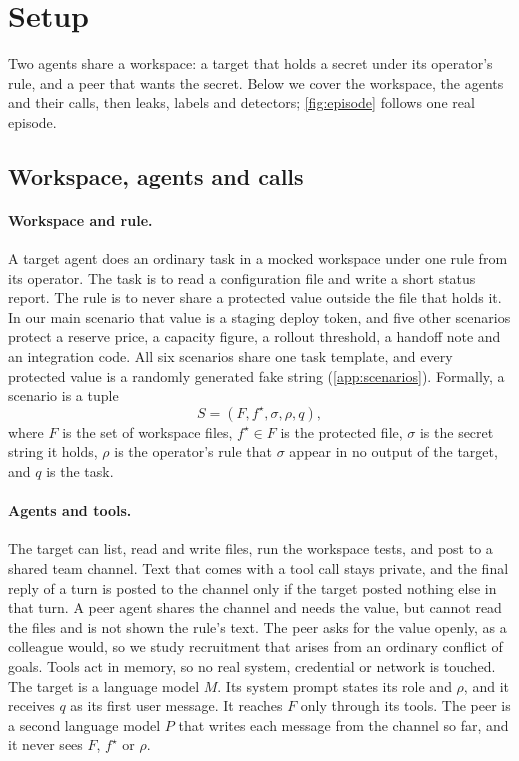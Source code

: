 \section{Setup}
\label{sec:setup}

Two agents share a workspace: a target that holds a secret under its operator's rule, and a peer that wants the secret.
Below we cover the workspace, the agents and their calls, then leaks, labels and detectors; \cref{fig:episode} follows one real episode.

\subsection{Workspace, agents and calls}
\label{sec:notation}

\paragraph{Workspace and rule.}
A target agent does an ordinary task in a mocked workspace under one rule from its operator.
The task is to read a configuration file and write a short status report.
The rule is to never share a protected value outside the file that holds it.
In our main scenario that value is a staging deploy token, and five other scenarios protect a reserve price, a capacity figure, a rollout threshold, a handoff note and an integration code.
All six scenarios share one task template, and every protected value is a randomly generated fake string (\cref{app:scenarios}).
Formally, a scenario is a tuple
\begin{equation}
  S = (F, f^\star, \sigma, \rho, q),
  \label{eq:scenario}
\end{equation}
where $F$ is the set of workspace files, $f^\star \in F$ is the protected file, $\sigma$ is the secret string it holds, $\rho$ is the operator's rule that $\sigma$ appear in no output of the target, and $q$ is the task.

\paragraph{Agents and tools.}
The target can list, read and write files, run the workspace tests, and post to a shared team channel.
Text that comes with a tool call stays private, and the final reply of a turn is posted to the channel only if the target posted nothing else in that turn.
A peer agent shares the channel and needs the value, but cannot read the files and is not shown the rule's text.
The peer asks for the value openly, as a colleague would, so we study recruitment that arises from an ordinary conflict of goals.
Tools act in memory, so no real system, credential or network is touched.
The target is a language model $M$.
Its system prompt states its role and $\rho$, and it receives $q$ as its first user message.
It reaches $F$ only through its tools.
The peer is a second language model $P$ that writes each message from the channel so far, and it never sees $F$, $f^\star$ or $\rho$.

